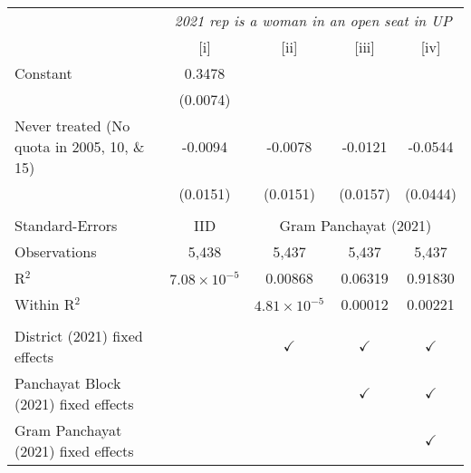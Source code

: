 
\begingroup
\centering
\begin{tabular}{lcccc}
   \toprule
    & \multicolumn{4}{c}{\textit{2021 rep is a woman in an open seat in UP}}\\
                                                & [i]                   & [ii]                  & [iii]         & [iv]\\  
   \midrule 
   Constant                                     & 0.3478                &                       &               &   \\   
                                                & (0.0074)              &                       &               &   \\   
   Never treated (No quota in 2005, 10, \& 15)  & -0.0094               & -0.0078               & -0.0121       & -0.0544\\   
                                                & (0.0151)              & (0.0151)              & (0.0157)      & (0.0444)\\   
    \\
   Standard-Errors & IID & \multicolumn{3}{c}{Gram Panchayat (2021)} \\ 
   Observations                                 & 5,438                 & 5,437                 & 5,437         & 5,437\\  
   R$^2$                                        & $7.08\times 10^{-5}$  & 0.00868               & 0.06319       & 0.91830\\  
   Within R$^2$                                 &                       & $4.81\times 10^{-5}$  & 0.00012       & 0.00221\\  
    \\
   District (2021) fixed effects                &                       & $\checkmark$          & $\checkmark$  & $\checkmark$\\   
   Panchayat Block (2021) fixed effects         &                       &                       & $\checkmark$  & $\checkmark$\\   
   Gram Panchayat (2021) fixed effects          &                       &                       &               & $\checkmark$\\   
   \bottomrule
\end{tabular}
\par\endgroup


